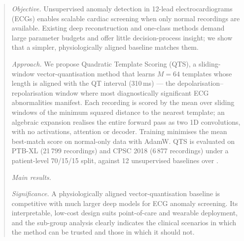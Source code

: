\documentclass{iopjournal}
\begin{document}
\begin{abstract}
\textit{Objective.} Unsupervised anomaly detection in 12-lead electrocardiograms (ECGs) enables scalable cardiac screening when only normal recordings are available. Existing deep reconstruction and one-class methods demand large parameter budgets and offer little decision-process insight; we show that a simpler, physiologically aligned baseline matches them.

\textit{Approach.} We propose Quadratic Template Scoring (QTS), a sliding-window vector-quantisation method that learns $M = 64$ templates whose length is aligned with the QT interval (310\,ms) --- the depolarisation--repolarisation window where most diagnostically significant ECG abnormalities manifest. Each recording is scored by the mean over sliding windows of the minimum squared distance to the nearest template; an algebraic expansion realises the entire forward pass as two 1D convolutions, with no activations, attention or decoder. Training minimises the mean best-match score on normal-only data with AdamW. QTS is evaluated on PTB-XL (21\,799 recordings) and CPSC 2018 (6\,877 recordings) under a patient-level 70/15/15 split, against 12 unsupervised baselines over .

\textit{Main results.} 

\textit{Significance.} A physiologically aligned vector-quantisation baseline is competitive with much larger deep models for ECG anomaly screening. Its interpretable, low-cost design suits point-of-care and wearable deployment, and the sub-group analysis clearly indicates the clinical scenarios in which the method can be trusted and those in which it should not. 
\end{abstract}
\end{document}
